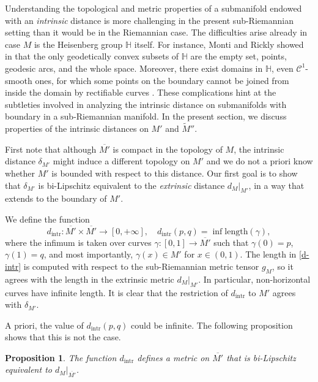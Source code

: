 \documentclass[10pt,letterpaper]{amsart}
\newtheorem{prop}[thm]{Proposition}
\theoremstyle{definition}
\numberwithin{thm}{subsection}
\numberwithin{equation}{section}
\begin{document}
Understanding the topological and metric properties of a
submanifold endowed with an \emph{intrinsic} distance
is more
challenging in the present sub-Riemannian setting than it would be
in the Riemannian case. The difficulties arise already in case $M$
is the Heisenberg group ${\mathbb H}$ itself. For instance, Monti and
Rickly showed in \cite{MR2135806} that the only geodetically
convex subsets of ${\mathbb H}$ are the empty set, points,
geodesic arcs, and the whole space. Moreover, there exist domains
in ${\mathbb H}$, even $\mathcal{C}^1$-smooth ones, for which some
points on the boundary cannot be joined from inside the domain by
rectifiable curves \cite{MR2021252}. These complications hint at
the subtleties involved in analyzing the intrinsic distance on
submanifolds with boundary in a sub-Riemannian manifold. In the
present section, we discuss properties of the intrinsic distances
on $M'$ and $\widetilde{M}''$.

First note that although $\overline{M'}$ is compact in the topology of $M$, the intrinsic distance $\delta_{M'}$ might induce a different topology on $M'$ and we do not a priori know whether $M'$ is bounded with respect to this distance. Our first goal is to show that $\delta_{M'}$ is bi-Lipschitz equivalent to the \emph{extrinsic} distance $d_M|_{M'}$, in a way that extends to the boundary of $M'$.

We define the function
\begin{equation}\label{d-intr}
d_{\mathrm{intr}}:\overline{M'}\times \overline{M'} \to [0,+\infty],\quad d_{\mathrm{intr}}(p,q)=\inf \mathrm{length}(\gamma),
\end{equation}
where the infimum is taken over curves $\gamma:[0,1] \to \overline{M'}$ such that $\gamma(0)=p$, $\gamma(1)=q$, and most importantly, $\gamma(x)\in M'$ for $x\in (0,1)$. The length in \eqref{d-intr} is computed with respect to the sub-Riemannian metric tensor $g_M$, so it agrees with the length in the extrinsic metric $d_M|_{M'}$. In particular, non-horizontal curves have infinite length. It is clear that the restriction of $d_{\mathrm{intr}}$ to $M'$ agrees with $\delta_{M'}$.

A priori, the value of $d_{\mathrm{intr}}(p,q)$ could be infinite. The following proposition shows that this is not the case.

\begin{prop}\label{p:biLip_metric}
The function $d_{\mathrm{intr}}$ defines a metric on $\overline{M'}$ that is bi-Lipschitz equivalent to $d_M|_{\overline{M'}}$.
\end{prop}
\end{document}
